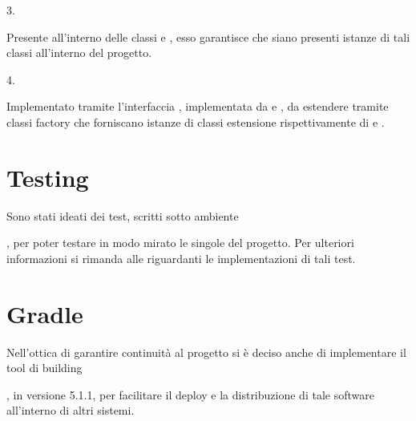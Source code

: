 \documentclass[letterpaper,10pt,italian,openany,oneside]{sphinxmanual}
\begin{document}
3.  %
\begin{footnote}[4]\sphinxAtStartFootnote
{}
%
\end{footnote}
Presente all’interno delle classi  e , esso garantisce che siano presenti  istanze di tali classi all’interno del progetto.

4.  %
\begin{footnote}[5]\sphinxAtStartFootnote
{}
%
\end{footnote}
Implementato tramite l’interfaccia , implementata da  e ,  da estendere tramite classi factory che forniscano istanze di classi estensione rispettivamente di  e .


\section{Testing}
\label{\detokenize{introduzione:testing}}
Sono stati ideati dei test, scritti sotto ambiente  %
\begin{footnote}[6]\sphinxAtStartFootnote
{}
%
\end{footnote}, per poter testare in modo mirato le singole  del progetto.
Per ulteriori informazioni si rimanda alle {\hyperref[\detokenize{test/packages::doc}]{}}  riguardanti le implementazioni di tali test.


\section{Gradle}
\label{\detokenize{introduzione:gradle}}
Nell’ottica di garantire continuità al progetto si è deciso anche di implementare il tool di building  %
\begin{footnote}[7]\sphinxAtStartFootnote
{}
%
\end{footnote}, in versione 5.1.1,
per facilitare il deploy e la distribuzione di tale software all’interno di altri sistemi.
\end{document}
